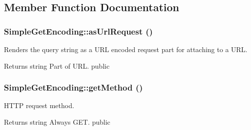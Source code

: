 \subsection{Member Function Documentation}
\hypertarget{class_simple_get_encoding_a29db0a2343a6e8d7eea3371bcb64059c}{
\subsubsection[{asUrlRequest}]{\setlength{\rightskip}{0pt plus 5cm}SimpleGetEncoding::asUrlRequest ()}}
\label{class_simple_get_encoding_a29db0a2343a6e8d7eea3371bcb64059c}
Renders the query string as a URL encoded request part for attaching to a URL. \begin{DoxyReturn}{Returns}
string Part of URL.  public 
\end{DoxyReturn}
\hypertarget{class_simple_get_encoding_ab8adaa71183f17a87edbcc7d27827861}{
\subsubsection[{getMethod}]{\setlength{\rightskip}{0pt plus 5cm}SimpleGetEncoding::getMethod ()}}
\label{class_simple_get_encoding_ab8adaa71183f17a87edbcc7d27827861}
HTTP request method. \begin{DoxyReturn}{Returns}
string Always GET.  public 
\end{DoxyReturn}


